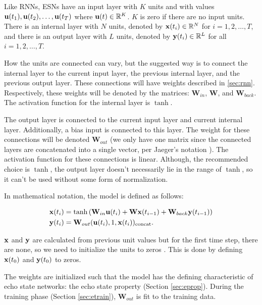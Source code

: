 \documentclass{article}
\begin{document}
Like RNNs, ESNs have an input layer with $K$ units and with values $\mathbf{u}(t_1),
\mathbf{u}(t_2), \dots, \mathbf{u}(t_T)$ where $\mathbf{u}(t) \in \mathbb{R}^K$. $K$ is zero if
there are no input units. There is an internal layer with $N$ units, denoted
by $\mathbf{x}(t_i) \in \mathbb{R}^N$ for $i = 1, 2, \dots, T$, and there is an
output layer with $L$ units, denoted by $\mathbf{y}(t_i) \in \mathbb{R}^L$ for all
$i = 1, 2, \dots, T$.

\newcommand{\W}{\mathbf{W}}
\newcommand{\Win}{\mathbf{W}_{in}}
\newcommand{\Wback}{\mathbf{W}_{back}}
\newcommand{\Wout}{\mathbf{W}_{out}}

How the units are connected can vary, but the suggested way
\cite{jaeger2002tutorial} is to connect the internal layer to the current
input layer, the previous internal layer, and the previous output layer.
These connections will have weights described in \ref{sec:rnn}. Respectively,
these weights will be denoted by the matrices: $\Win$, $\W$, and $\Wback$.
The activation function for the internal layer is $\tanh$.

The output layer is connected to the current input layer and current internal
layer. Additionally, a bias input is connected to this layer. The weight for
these connections will be denoted $\Wout$ (we only have one matrix since the
connected layers are concatenated into a single vector, per Jaeger's notation
\cite{jaeger2002tutorial}). The activation function for these connections is
linear. Although, the recommended choice is $\tanh$, the output layer doesn't
necessarily lie in the range of $\tanh$, so it can't be used without some
form of normalization.

In mathematical notation, the model is defined as follows:

\begin{align}
    \xv(t_{i}) &= \tanh \left(
            \Win \uv(t_i)
            + \W \xv(t_{i-1})
            + \Wback \yv(t_{i-1})
        \right) \\
    \yv(t_i) &= \Wout (\uv(t_i), 1, \xv(t_i))_{\text{concat}}.
\end{align}

$\mathbf{x}$ and $\mathbf{y}$ are calculated from previous unit values but for the first
time step, there are none, so we need to initialize the units to zeros
\cite{jaeger2002tutorial}. This is done by defining $\mathbf{x}(t_0)$ and $\mathbf{y}(t_0)$
to zeros.

The weights are initialized such that the model has the defining
characteristic of echo state networks: the echo state property (Section
\ref{sec:eprop}). During the training phase (Section \ref{sec:etrain}),
$\Wout$ is fit to the training data.
\end{document}
